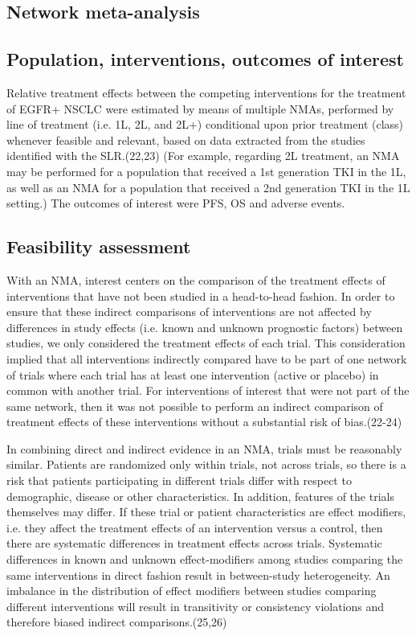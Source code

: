 \documentclass[11pt,final,fleqn]{article}\usepackage[]{graphicx}\usepackage[]{color}
\theoremstyle{plain}
\begin{document}
{\begin{appendices}
\section{Network meta-analysis}

\subsection{Population, interventions, outcomes of interest}

Relative treatment effects between the competing interventions for the treatment of EGFR+ NSCLC were estimated by means of multiple NMAs, performed by line of treatment (i.e. 1L, 2L, and 2L+) conditional upon prior treatment (class) whenever feasible and relevant, based on data extracted from the studies identified with the SLR.(22,23) (For example, regarding 2L treatment, an NMA may be performed for a population that received a 1st generation TKI in the 1L, as well as an NMA for a population that received a 2nd generation TKI in the 1L setting.) The outcomes of interest were PFS, OS and adverse events. 

\subsection{Feasibility assessment}

With an NMA, interest centers on the comparison of the treatment effects of interventions that have not been studied in a head-to-head fashion. In order to ensure that these indirect comparisons of interventions are not affected by differences in study effects (i.e. known and unknown prognostic factors) between studies, we only considered the treatment effects of each trial. This consideration implied that all interventions indirectly compared have to be part of one network of trials where each trial has at least one intervention (active or placebo) in common with another trial. For interventions of interest that were not part of the same network, then it was not possible to perform an indirect comparison of treatment effects of these interventions without a substantial risk of bias.(22-24)

In combining direct and indirect evidence in an NMA, trials must be reasonably similar. Patients are randomized only within trials, not across trials, so there is a risk that patients participating in different trials differ with respect to demographic, disease or other characteristics. In addition, features of the trials themselves may differ. If these trial or patient characteristics are effect modifiers, i.e. they affect the treatment effects of an intervention versus a control, then there are systematic differences in treatment effects across trials. Systematic differences in known and unknown effect-modifiers among studies comparing the same interventions in direct fashion result in between-study heterogeneity. An imbalance in the distribution of effect modifiers between studies comparing different interventions will result in transitivity or consistency violations and therefore biased indirect comparisons.(25,26) 


\end{appendices}}
\end{document}

